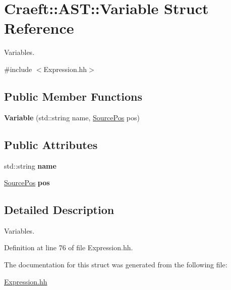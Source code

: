 \hypertarget{struct_craeft_1_1_a_s_t_1_1_variable}{}\section{Craeft\+:\+:A\+ST\+:\+:Variable Struct Reference}
\label{struct_craeft_1_1_a_s_t_1_1_variable}


Variables.  




{\ttfamily \#include $<$Expression.\+hh$>$}

\subsection*{Public Member Functions}
\begin{DoxyCompactItemize}
\item 
\hypertarget{struct_craeft_1_1_a_s_t_1_1_variable_aba67ba3e6c2128f5fa2dd4d172eb902b}{}\label{struct_craeft_1_1_a_s_t_1_1_variable_aba67ba3e6c2128f5fa2dd4d172eb902b} 
{\bfseries Variable} (std\+::string name, \hyperlink{struct_craeft_1_1_source_pos}{Source\+Pos} pos)
\end{DoxyCompactItemize}
\subsection*{Public Attributes}
\begin{DoxyCompactItemize}
\item 
\hypertarget{struct_craeft_1_1_a_s_t_1_1_variable_a8c8b5131694f2bcaffc07f9bf7857c88}{}\label{struct_craeft_1_1_a_s_t_1_1_variable_a8c8b5131694f2bcaffc07f9bf7857c88} 
std\+::string {\bfseries name}
\item 
\hypertarget{struct_craeft_1_1_a_s_t_1_1_variable_a0e470ba82781ef42ebb13e3a897b90bf}{}\label{struct_craeft_1_1_a_s_t_1_1_variable_a0e470ba82781ef42ebb13e3a897b90bf} 
\hyperlink{struct_craeft_1_1_source_pos}{Source\+Pos} {\bfseries pos}
\end{DoxyCompactItemize}


\subsection{Detailed Description}
Variables. 

Definition at line 76 of file Expression.\+hh.



The documentation for this struct was generated from the following file\+:\begin{DoxyCompactItemize}
\item 
\hyperlink{_expression_8hh}{Expression.\+hh}\end{DoxyCompactItemize}
